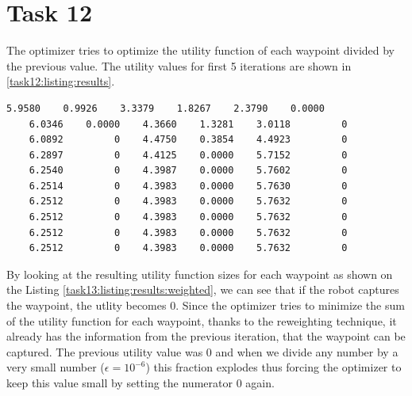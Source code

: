 \section {Task 12}

The optimizer tries to optimize the utility function of each waypoint divided by the previous value. The utility values for first 5 iterations are shown in \ref{task12:listing:results}.

\begin{lstlisting}[label=task12:listing:results, caption=Unweighted utility function for each waypoint., float=!htb]
    5.9580    0.9926    3.3379    1.8267    2.3790    0.0000
    6.0346    0.0000    4.3660    1.3281    3.0118         0
    6.0892         0    4.4750    0.3854    4.4923         0
    6.2897         0    4.4125    0.0000    5.7152         0
    6.2540         0    4.3987    0.0000    5.7602         0
    6.2514         0    4.3983    0.0000    5.7630         0
    6.2512         0    4.3983    0.0000    5.7632         0
    6.2512         0    4.3983    0.0000    5.7632         0
    6.2512         0    4.3983    0.0000    5.7632         0
    6.2512         0    4.3983    0.0000    5.7632         0
\end{lstlisting}

By looking at the resulting utility function sizes for each waypoint as shown on the Listing \ref{task13:listing:results:weighted}, we can see that if the robot captures the waypoint, the utlity becomes $0$. Since the optimizer tries to minimize the sum of the utility function for each waypoint, thanks to the reweighting technique, it already has the information from the previous iteration, that the waypoint can be captured. The previous utility value was $0$ and when we divide any number by a very small number ($\epsilon = 10^{-6}$) this fraction explodes thus forcing the optimizer to keep this value small by setting the numerator $0$ again.  